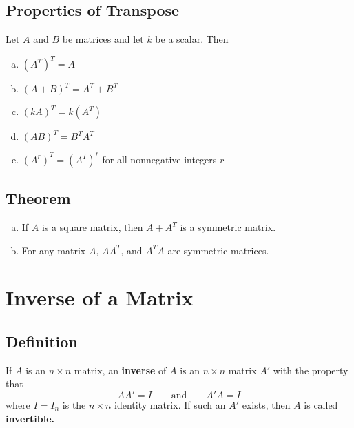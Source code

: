 \subsection*{Properties of Transpose}
Let $A$ and $B$ be matrices and let $k$ be a scalar. Then
\begin{enumerate}[(a)]
    \item $(A^T)^T=A$
    \item $(A+B)^T=A^T+B^T$
    \item $(kA)^T=k(A^T)$
    \item $(AB)^T=B^TA^T$
    \item $(A^r)^T=(A^T)^r$ for all nonnegative integers $r$
\end{enumerate}

\subsection*{Theorem}
\begin{enumerate}[(a)]
    \item If $A$ is a square matrix, then $A+A^T$ is a symmetric matrix.
    \item For any matrix $A$, $AA^T$, and $A^TA$ are symmetric matrices.
\end{enumerate}

\section{Inverse of a Matrix}

\subsection*{Definition}
If $A$ is an $n\times n$ matrix, an \textbf{inverse} of $A$ is an $n\times n$ matrix
$A'$ with the property that
\[AA'=I \qquad \text{and} \qquad A'A=I\]
where $I=I_n$ is the $n\times n$ identity matrix. If such an $A'$ exists, then $A$
is called \textbf{invertible.}

